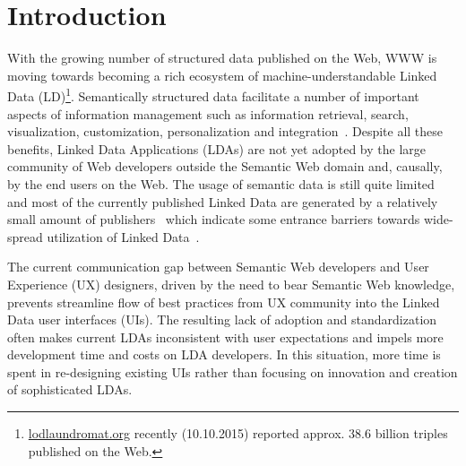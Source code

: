 \documentclass{acm_proc_article-sp}
\begin{document}




\section{Introduction}


With the growing number of structured data published on the Web, WWW is moving towards becoming a rich ecosystem of machine-understandable Linked Data (LD)\footnote{\url{lodlaundromat.org} recently (10.10.2015) reported approx. 38.6 billion triples published on the Web.}.
Semantically structured data facilitate a number of important aspects of
information management such as information retrieval, search, visualization,  customization, personalization and integration~\cite{SCAJ-Khalili-2013}.
Despite all these benefits, Linked Data Applications (LDAs) are not yet adopted by the large community of Web developers outside the Semantic Web domain and, causally, by the end users on the Web.
The usage of semantic data is still quite limited and most of the currently published Linked Data are generated by a relatively small amount of publishers~\cite{ontowiki-swj} which indicate some entrance barriers towards wide-spread utilization of Linked Data~\cite{Benson2014}.

The current communication gap between Semantic Web developers and User Experience (UX) designers, driven by the need to bear Semantic Web knowledge, prevents streamline flow of best practices from UX community into the Linked Data user interfaces (UIs).
The resulting lack of adoption and standardization often makes current LDAs inconsistent with user expectations and impels more development time and costs on LDA developers.
In this situation, more time is spent in re-designing existing UIs rather than focusing on innovation and creation of sophisticated LDAs.
 
\end{document}
